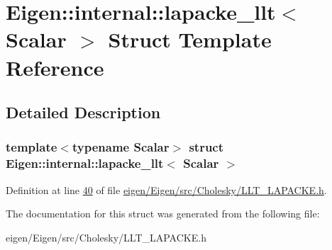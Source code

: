 \hypertarget{struct_eigen_1_1internal_1_1lapacke__llt}{}\section{Eigen\+:\+:internal\+:\+:lapacke\+\_\+llt$<$ Scalar $>$ Struct Template Reference}
\label{struct_eigen_1_1internal_1_1lapacke__llt}


\subsection{Detailed Description}
\subsubsection*{template$<$typename Scalar$>$\newline
struct Eigen\+::internal\+::lapacke\+\_\+llt$<$ Scalar $>$}



Definition at line \hyperlink{eigen_2_eigen_2src_2_cholesky_2_l_l_t___l_a_p_a_c_k_e_8h_source_l00040}{40} of file \hyperlink{eigen_2_eigen_2src_2_cholesky_2_l_l_t___l_a_p_a_c_k_e_8h_source}{eigen/\+Eigen/src/\+Cholesky/\+L\+L\+T\+\_\+\+L\+A\+P\+A\+C\+K\+E.\+h}.



The documentation for this struct was generated from the following file\+:\begin{DoxyCompactItemize}
\item 
eigen/\+Eigen/src/\+Cholesky/\+L\+L\+T\+\_\+\+L\+A\+P\+A\+C\+K\+E.\+h\end{DoxyCompactItemize}
